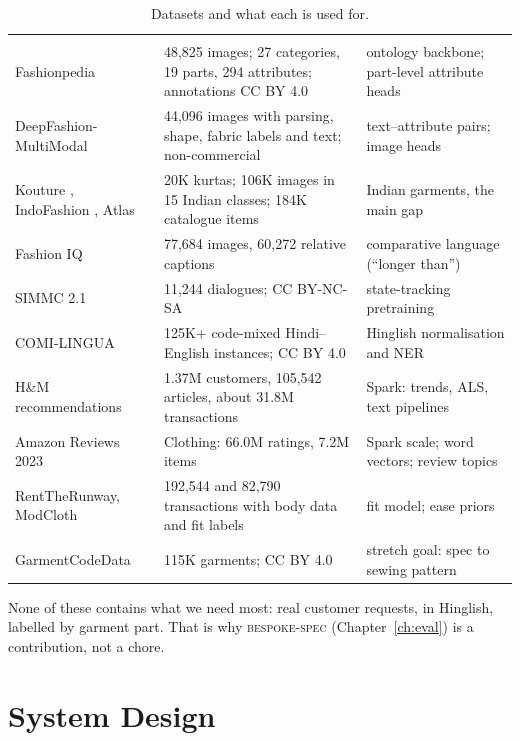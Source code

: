 \begin{table}[h]
\centering\small
\caption{Datasets and what each is used for.}\label{tab:data}
\begin{tabularx}{\textwidth}{@{}P{3.4cm}P{4.0cm}L@{}}
 &  & \\
Fashionpedia \cite{jia2020fashionpedia} & 48,825 images; 27 categories, 19 parts, 294 attributes; annotations CC BY 4.0 & ontology backbone; part-level attribute heads\\
DeepFashion-MultiModal \cite{jiang2022text2human} & 44,096 images with parsing, shape, fabric labels and text; non-commercial & text--attribute pairs; image heads\\
Kouture \cite{suman2025kouture}, IndoFashion \cite{rajput2021indofashion}, Atlas \cite{umaashankar2020atlas} & 20K kurtas; 106K images in 15 Indian classes; 184K catalogue items & Indian garments, the main gap\\
Fashion IQ \cite{wu2021fashioniq} & 77,684 images, 60,272 relative captions & comparative language (``longer than'')\\
SIMMC 2.1 \cite{kottur2021simmc} & 11,244 dialogues; CC BY-NC-SA & state-tracking pretraining\\
COMI-LINGUA \cite{comilingua} & 125K+ code-mixed Hindi--English instances; CC BY 4.0 & Hinglish normalisation and NER\\
H\&M recommendations \cite{hm2022} & 1.37M customers, 105,542 articles, about 31.8M transactions & Spark: trends, ALS, text pipelines\\
Amazon Reviews 2023 \cite{hou2024amazon} & Clothing: 66.0M ratings, 7.2M items & Spark scale; word vectors; review topics\\
RentTheRunway, ModCloth \cite{misra2018fit} & 192,544 and 82,790 transactions with body data and fit labels & fit model; ease priors\\
GarmentCodeData \cite{korosteleva2024gcd} & 115K garments; CC BY 4.0 & stretch goal: spec to sewing pattern\\
\end{tabularx}
\end{table}

None of these contains what we need most: real customer requests, in Hinglish, labelled by garment part. That is why \textsc{bespoke-spec} (Chapter~\ref{ch:eval}) is a contribution, not a chore.

\chapter{System Design}\label{ch:design}

